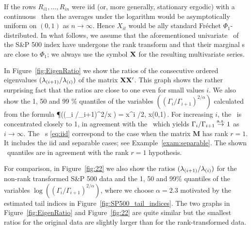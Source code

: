 If the rows $R_{i1}, \ldots, R_{in}$ were iid (or, more generally, stationary ergodic)
with a continuous \ds\  then
the averages under the logarithm would be  asymptotically uniform
on $(0,1)$ as $n \to \infty$. Hence $X_{it}$ would  be \asy ally standard
Fr\'echet $\Phi_1$-distributed.
In what follows, we assume that the aforementioned univariate \ts\ of the S\&P 500 index have undergone the rank transform and that
their marginal \ds s are close to $\Phi_1$; we
always use the symbol ${\mathbf X}$ for the resulting multivariate series.
\par
In Figure~\ref{fig:EigenRatio} we show the ratios of the consecutive ordered eigenvalues $(\lambda_{(i+1)}/\lambda_{(i)})$
of the matrix ${\mathbf X}{\mathbf X}'$. This graph shows the rather surprising fact that the ratios are close to one even for small values $i$.
We also show the 1, 50 and 99 \% quantiles of the variables $((\Gamma_{i}/\Gamma_{i+1})^{2/\alpha})$ calculated from the formula
\beam\label{eq:iid}
\P\big((\Gamma_{i} /\Gamma_{i+1})^{2/\alpha}\le x \big) = x^{i \cdot \alpha/2}, \quad x\in (0,1)\,.
\eeam
For increasing $i$, the \ds\ is concentrated closely to 1, in agreement with the \slln\ which yields
$\Gamma_{i} /\Gamma_{i+1}\stackrel{\rm a.s.}{\rightarrow} 1$ as $i\to\infty$.
The \asy\ \ds s \eqref{eq:iid} correspond to the case when the matrix
$\mathbf M$ has rank $r=1$. It includes the iid and separable cases;
see Example~\ref{exam:separable}. The shown \asy\ quantiles are in agreement with the rank $r=1$ hypothesis.
\par
For comparison, in Figure~\ref{fig:22} we also show the ratios  $(\lambda_{(i+1)}/\lambda_{(i)})$ for the 
non-rank transformed S\&P 500 data and the 1, 50 and 99\% quantiles of the variables
$\log((\Gamma_i/ \Gamma_{i+1})^{2/\alpha})$, where we choose $\alpha=2.3$ motivated by the estimated tail indices in 
Figure~\ref{fig:SP500_tail_indices}.
The two graphs in Figure~\ref{fig:EigenRatio} and Figure~\ref{fig:22} are quite similar but the smallest ratios for the original data are slightly larger than
for the rank-transformed data.




